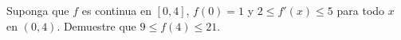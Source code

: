 \item Suponga que $f$ es continua en $[0, 4]$, $f(0) = 1$ y $2 \le f'(x) \le 5$ para todo $x$ en $(0, 4)$. Demuestre que $9 \le f(4) \le 21$.

